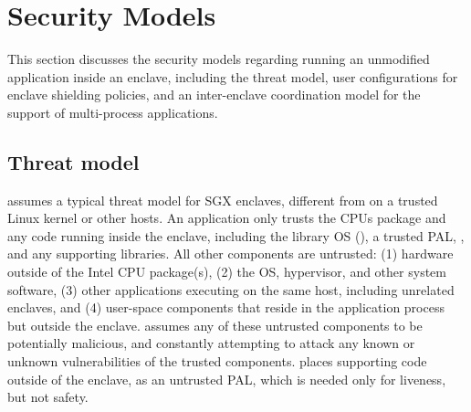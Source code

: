 \section{Security Models}
\label{sec:sgx:security}

This section discusses 
the security models regarding running an unmodified application
inside an enclave, including the threat model,
user configurations for enclave shielding policies,
and an inter-enclave coordination model for the support of
multi-process applications.




\subsection{Threat model}
\label{sec:sgx:overview:threat}

\graphenesgx{} assumes a typical threat model for SGX enclaves, different from \graphene{} on a trusted Linux kernel or other hosts.
An application only trusts the CPUs package and any code running inside the enclave, including the library OS (\thelibos{}), a trusted PAL, \libc{}, and any supporting libraries. 
All other components are untrusted:
(1) hardware outside of the Intel CPU package(s),
(2) the OS, hypervisor, and other system software,
(3) other applications executing on the same host, including unrelated enclaves,
and (4) user-space components that
reside in the application process but outside the enclave.
\graphenesgx{}
assumes any of these untrusted components to be potentially malicious,
and constantly attempting to attack
any known or unknown vulnerabilities of the trusted components.
\graphenesgx{} places supporting code outside of the enclave, as an untrusted PAL, which is needed
only for liveness, but not safety.





